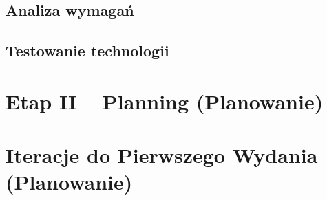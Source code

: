 \subsection{Analiza wymagań}
\label{sec:SWbAnalizaWymagan}

\subsection{Testowanie technologii}
\label{sec:SWbTestowanieTechnologii}

\section{Etap II -- Planning (Planowanie)}
\label{sec:SWbplanowanie}

\section{Iteracje do Pierwszego Wydania (Planowanie)}
\label{sec:SWbIteracjeDoPierwszegoWydania}

\newpage

